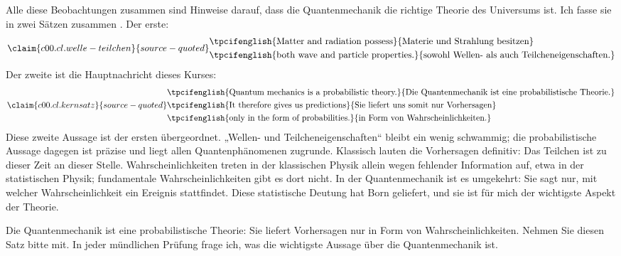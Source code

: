 Alle diese Beobachtungen zusammen sind Hinweise darauf, dass die Quantenmechanik die richtige
Theorie des Universums ist. Ich fasse sie in zwei Sätzen zusammen
. Der erste:
\begin{equation}\label{c00.eq.welle-teilchen}\claim{c00.cl.welle-teilchen}{source-quoted}
  \begin{aligned}
    &\text{\tpcifenglish{Matter and radiation possess}{Materie und Strahlung besitzen}} \\
    &\text{\tpcifenglish{both wave and particle properties.}{sowohl Wellen- als auch Teilcheneigenschaften.}}
  \end{aligned}
\end{equation}
Der zweite ist die Hauptnachricht dieses Kurses:
\begin{equation}\label{c00.eq.kernsatz}\claim{c00.cl.kernsatz}{source-quoted}
  \begin{aligned}
    &\text{\tpcifenglish{Quantum mechanics is a probabilistic theory.}{Die Quantenmechanik ist eine probabilistische Theorie.}} \\
    &\text{\tpcifenglish{It therefore gives us predictions}{Sie liefert uns somit nur Vorhersagen}} \\
    &\text{\tpcifenglish{only in the form of probabilities.}{in Form von Wahrscheinlichkeiten.}}
  \end{aligned}
\end{equation}
Diese zweite Aussage ist der ersten übergeordnet. „Wellen- und Teilcheneigenschaften“ bleibt
ein wenig schwammig; die probabilistische Aussage dagegen ist präzise und liegt allen
Quantenphänomenen zugrunde. Klassisch lauten die Vorhersagen definitiv: Das Teilchen ist zu
dieser Zeit an dieser Stelle. Wahrscheinlichkeiten treten in der klassischen Physik allein
wegen fehlender Information auf, etwa in der statistischen Physik; fundamentale
Wahrscheinlichkeiten gibt es dort nicht. In der Quantenmechanik ist es umgekehrt: Sie sagt
nur, mit welcher Wahrscheinlichkeit ein Ereignis stattfindet. Diese statistische Deutung hat
Born geliefert, und sie ist für mich der wichtigste Aspekt der Theorie.

\begin{merksatz}
  Die Quantenmechanik ist eine probabilistische Theorie: Sie liefert Vorhersagen nur in
  Form von Wahrscheinlichkeiten. Nehmen Sie diesen Satz bitte mit. In jeder mündlichen
  Prüfung frage ich, was die wichtigste Aussage über die Quantenmechanik ist.
\end{merksatz}

